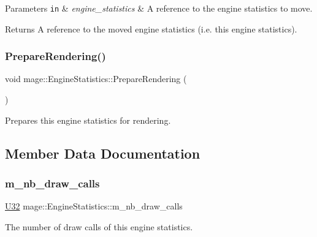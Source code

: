 \begin{DoxyParams}[1]{Parameters}
\mbox{\tt in}  & {\em engine\+\_\+statistics} & A reference to the engine statistics to move. \\
\hline
\end{DoxyParams}
\begin{DoxyReturn}{Returns}
A reference to the moved engine statistics (i.\+e. this engine statistics). 
\end{DoxyReturn}
\hypertarget{structmage_1_1_engine_statistics_a722912aa5e93caff589a52bb10be930d}{}\label{structmage_1_1_engine_statistics_a722912aa5e93caff589a52bb10be930d} 
\subsubsection{\texorpdfstring{Prepare\+Rendering()}{PrepareRendering()}}
{\footnotesize\ttfamily void mage\+::\+Engine\+Statistics\+::\+Prepare\+Rendering (\begin{DoxyParamCaption}{ }\end{DoxyParamCaption})\hspace{0.3cm}{\ttfamily [noexcept]}}

Prepares this engine statistics for rendering. 

\subsection{Member Data Documentation}
\hypertarget{structmage_1_1_engine_statistics_a26eeba872cebff2657b8b023751b1894}{}\label{structmage_1_1_engine_statistics_a26eeba872cebff2657b8b023751b1894} 
\subsubsection{\texorpdfstring{m\+\_\+nb\+\_\+draw\+\_\+calls}{m\_nb\_draw\_calls}}
{\footnotesize\ttfamily \hyperlink{namespacemage_a41c104c036fba3756a74e19f793eeaa1}{U32} mage\+::\+Engine\+Statistics\+::m\+\_\+nb\+\_\+draw\+\_\+calls\hspace{0.3cm}{\ttfamily [private]}}

The number of draw calls of this engine statistics. 